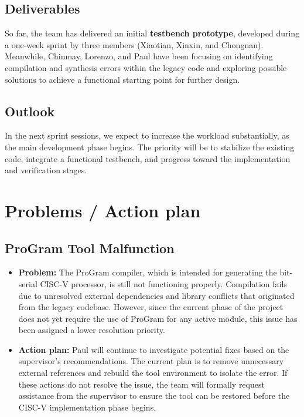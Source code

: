 \documentclass[10pt]{article}
\begin{document}
\subsection{Deliverables}
So far, the team has delivered an initial \textbf{testbench prototype}, developed during a one-week sprint by three members (Xiaotian, Xinxin, and Chongnan). Meanwhile, Chinmay, Lorenzo, and Paul have been focusing on identifying compilation and synthesis errors within the legacy code and exploring possible solutions to achieve a functional starting point for further design.

\subsection{Outlook}
In the next sprint sessions, we expect to increase the workload substantially, as the main development phase begins. The priority will be to stabilize the existing code, integrate a functional testbench, and progress toward the implementation and verification stages.



\section{Problems / Action plan}
\subsection{ProGram Tool Malfunction}
\begin{itemize}
    \item \textbf{Problem:} The ProGram compiler, which is intended for generating the bit-serial CISC-V processor, is still not functioning properly. Compilation fails due to unresolved external dependencies and library conflicts that originated from the legacy codebase. However, since the current phase of the project does not yet require the use of ProGram for any active module, this issue has been assigned a lower resolution priority.
    
    \item \textbf{Action plan:} Paul will continue to investigate potential fixes based on the supervisor’s recommendations. The current plan is to remove unnecessary external references and rebuild the tool environment to isolate the error. If these actions do not resolve the issue, the team will formally request assistance from the supervisor to ensure the tool can be restored before the CISC-V implementation phase begins.
\end{itemize}
\end{document}
